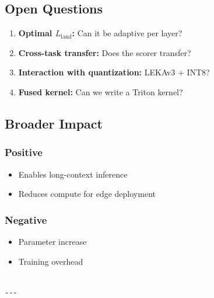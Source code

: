 \subsection{Open Questions}

\begin{enumerate}
\item \textbf{Optimal $L_\text{land}$:} Can it be adaptive per layer?
\item \textbf{Cross-task transfer:} Does the scorer transfer?
\item \textbf{Interaction with quantization:} LEKAv3 + INT8?
\item \textbf{Fused kernel:} Can we write a Triton kernel?

\end{enumerate}
\subsection{Broader Impact}

\subsubsection{Positive}
\begin{itemize}
\item Enables long-context inference
\item Reduces compute for edge deployment

\end{itemize}
\subsubsection{Negative}
\begin{itemize}
\item Parameter increase
\item Training overhead
\end{itemize}
\begin{lstlisting}

---
\end{lstlisting}